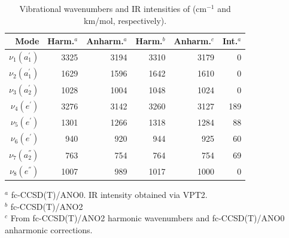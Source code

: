 \begin{table}[ht]
  \caption{Vibrational wavenumbers and IR intensities of \cyc (cm$^{-1}$ and km/mol, respectively).}
    \begin{center}
    \begin{tabular}{rrrrrr} \hline
    
        Mode & Harm.$^a$ & Anharm.$^a$ & Harm.$^b$ & Anharm.$^c$ & Int.$^a$ \\ \hline
        $\nu_{1}(a^{'}_1)$   & 3325 & 3194 & 3310 & 3179 & 0 \\ %
        $\nu_{2}(a^{'}_1)$   & 1629 & 1596 & 1642 & 1610 & 0 \\ %
        $\nu_{3}(a^{'}_2)$   & 1028 & 1004 & 1048 & 1024 & 0 \\ %
        $\nu_{4}(e^{'})$     & 3276 & 3142 & 3260 & 3127 & 189 \\ %
        $\nu_{5}(e^{'})$     & 1301 & 1266 & 1318 & 1284 & 88 \\ %
        $\nu_{6}(e^{'})$     &  940 & 920  &  944 &  925 & 60 \\ %
        $\nu_{7}(a^{''}_2)$  &  763 & 754  &  764 &  754 & 69 \\ %
        $\nu_{8}(e^{''})$    & 1007 & 989  & 1017 & 1000 & 0 \\ %
                \bottomrule
        \hline
    \end{tabular}
    \end{center}
    $^a$ fc-CCSD(T)/ANO0. IR intensity obtained via VPT2. \\
    $^b$ fc-CCSD(T)/ANO2\\
    $^c$ From fc-CCSD(T)/ANO2 harmonic wavenumbers and fc-CCSD(T)/ANO0 anharmonic corrections.
\end{table}

